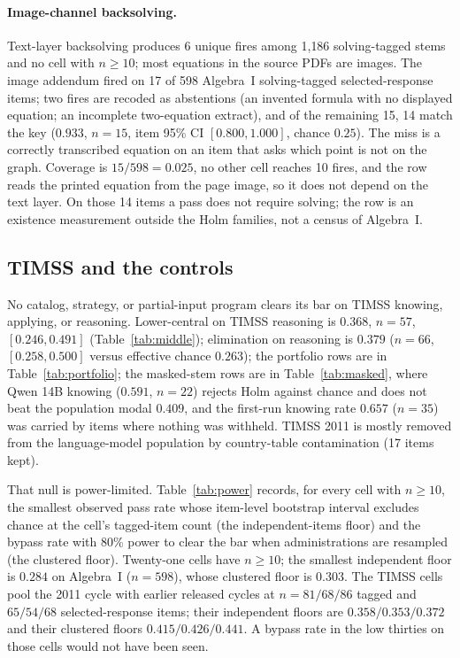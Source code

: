 \paragraph{Image-channel backsolving.}
Text-layer backsolving produces 6 unique fires among 1{,}186 solving-tagged stems and no cell with $n\ge 10$; most equations in the source PDFs are images. The image addendum fired on 17 of 598 Algebra~I solving-tagged selected-response items; two fires are recoded as abstentions (an invented formula with no displayed equation; an incomplete two-equation extract), and of the remaining 15, 14 match the key ($0.933$, $n=15$, item 95\% CI $[0.800, 1.000]$, chance $0.25$). The miss is a correctly transcribed equation on an item that asks which point is not on the graph. Coverage is $15/598=0.025$, no other cell reaches 10 fires, and the row reads the printed equation from the page image, so it does not depend on the text layer. On those 14 items a pass does not require solving; the row is an existence measurement outside the Holm families, not a census of Algebra~I.

\subsection{TIMSS and the controls}
\label{sec:timss}

No catalog, strategy, or partial-input program clears its bar on TIMSS knowing, applying, or reasoning. Lower-central on TIMSS reasoning is $0.368$, $n=57$, $[0.246, 0.491]$ (Table~\ref{tab:middle}); elimination on reasoning is $0.379$ ($n=66$, $[0.258, 0.500]$ versus effective chance $0.263$); the portfolio rows are in Table~\ref{tab:portfolio}; the masked-stem rows are in Table~\ref{tab:masked}, where Qwen 14B knowing ($0.591$, $n=22$) rejects Holm against chance and does not beat the population modal $0.409$, and the first-run knowing rate $0.657$ ($n=35$) was carried by items where nothing was withheld. TIMSS 2011 is mostly removed from the language-model population by country-table contamination (17 items kept).

That null is power-limited. Table~\ref{tab:power} records, for every cell with $n\ge 10$, the smallest observed pass rate whose item-level bootstrap interval excludes chance at the cell's tagged-item count (the independent-items floor) and the bypass rate with 80\% power to clear the bar when administrations are resampled (the clustered floor). Twenty-one cells have $n\ge 10$; the smallest independent floor is $0.284$ on Algebra~I ($n=598$), whose clustered floor is $0.303$. The TIMSS cells pool the 2011 cycle with earlier released cycles at $n=81/68/86$ tagged and $65/54/68$ selected-response items; their independent floors are $0.358/0.353/0.372$ and their clustered floors $0.415/0.426/0.441$. A bypass rate in the low thirties on those cells would not have been seen.

